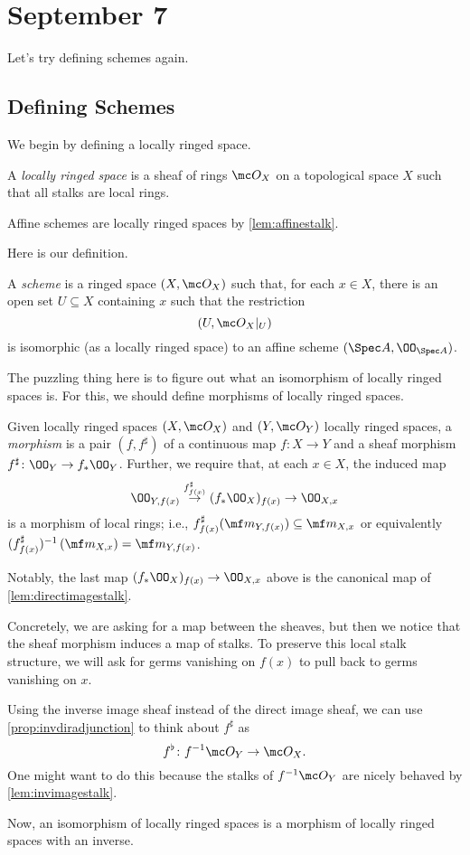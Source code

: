 \documentclass[../notes.tex]{subfiles}
\begin{document}
\section{September 7}
Let's try defining schemes again.

\subsection{Defining Schemes}
We begin by defining a locally ringed space.
\begin{definition}
	A \textit{locally ringed space} is a sheaf of rings $\mc O_X$ on a topological space $X$ such that all stalks are local rings.
\end{definition}
\begin{example}
	Affine schemes are locally ringed spaces by \autoref{lem:affinestalk}.
\end{example}
Here is our definition.
\begin{definition}[Scheme]
	A \textit{scheme} is a ringed space $(X,\mc O_X)$ such that, for each $x\in X$, there is an open set $U\subseteq X$ containing $x$ such that the restriction
	\[(U,\mc O_X|_U)\]
	is isomorphic (as a locally ringed space) to an affine scheme $(\Spec A,\OO_{\Spec A})$.
\end{definition}
The puzzling thing here is to figure out what an isomorphism of locally ringed spaces is. For this, we should define morphisms of locally ringed spaces.
\begin{definition}
	Given locally ringed spaces $(X,\mc O_X)$ and $(Y,\mc O_Y)$ locally ringed spaces, a \textit{morphism} is a pair $(f,f^\sharp)$ of a continuous map $f\colon X\to Y$ and a sheaf morphism $f^\sharp\colon\OO_Y\to f_*\OO_Y$. Further, we require that, at each $x\in X$, the induced map
	\[\OO_{Y,f(x)}\stackrel{f^\sharp_{f(x)}}\to(f_*\OO_X)_{f(x)}\to\OO_{X,x}\]
	is a morphism of local rings; i.e., $f^\sharp_{f(x)}(\mf m_{Y,f(x)})\subseteq\mf m_{X,x}$ or equivalently $(f^\sharp_{f(x)})^{-1}\left(\mf m_{X,x}\right)=\mf m_{Y,f(x)}$.
\end{definition}
Notably, the last map $(f_*\OO_X)_{f(x)}\to\OO_{X,x}$ above is the canonical map of \autoref{lem:directimagestalk}.

Concretely, we are asking for a map between the sheaves, but then we notice that the sheaf morphism induces a map of stalks. To preserve this local stalk structure, we will ask for germs vanishing on $f(x)$ to pull back to germs vanishing on $x$.
\begin{remark}
	Using the inverse image sheaf instead of the direct image sheaf, we can use \autoref{prop:invdiradjunction} to think about $f^\sharp$ as
	\[f^\flat\colon f^{-1}\mc O_Y\to\mc O_X.\]
	One might want to do this because the stalks of $f^{-1}\mc O_Y$ are nicely behaved by \autoref{lem:invimagestalk}.
\end{remark}
Now, an isomorphism of locally ringed spaces is a morphism of locally ringed spaces with an inverse.
\end{document}
